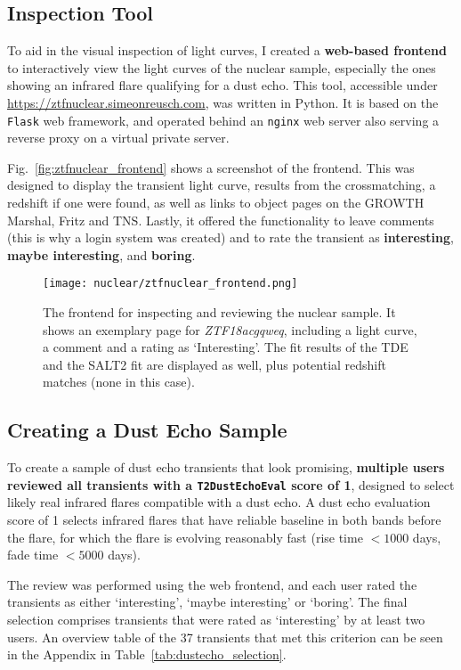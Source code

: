 \subsection{Inspection Tool}
To aid in the visual inspection of light curves, I created a \textbf{web-based frontend} to interactively view the light curves of the nuclear sample, especially the ones showing an infrared flare qualifying for a dust echo. This tool, accessible under \url{https://ztfnuclear.simeonreusch.com}, was written in Python. It is based on the \texttt{Flask} web framework, and operated behind an \texttt{nginx} web server also serving a reverse proxy on a virtual private server.

Fig.~\ref{fig:ztfnuclear_frontend} shows a screenshot of the frontend. This was designed to display the transient light curve, results from the crossmatching, a redshift if one were found, as well as links to object pages on the GROWTH Marshal, Fritz and TNS. Lastly, it offered the functionality to leave comments (this is why a login system was created) and to rate the transient as \textbf{interesting}, \textbf{maybe interesting}, and \textbf{boring}.

\begin{figure}[htpb]
  \texttt{[image: nuclear/ztfnuclear\_frontend.png]}
  \caption[Frontend for the nuclear sample]{The frontend for inspecting and reviewing the nuclear sample. It shows an exemplary page for \textit{ZTF18acgqweq}, including a light curve, a comment and a rating as `Interesting'. The fit results of the TDE and the SALT2 fit are displayed as well, plus potential redshift matches (none in this case).}
\end{figure}

\subsection{Creating a Dust Echo Sample}
To create a sample of dust echo transients that look promising, \textbf{multiple users reviewed all transients with a \texttt{T2DustEchoEval} score of 1}, designed to select likely real infrared flares compatible with a dust echo. A dust echo evaluation score of 1 selects infrared flares that have reliable baseline in both bands before the flare, for which the flare is evolving reasonably fast (rise time $<1000$ days, fade time $<5000$ days).

The review was performed using the web frontend, and each user rated the transients as either `interesting', `maybe interesting' or `boring'. The final selection comprises transients that were rated as `interesting' by at least two users. An overview table of the 37 transients that met this criterion can be seen in the Appendix in Table~\ref{tab:dustecho_selection}.

